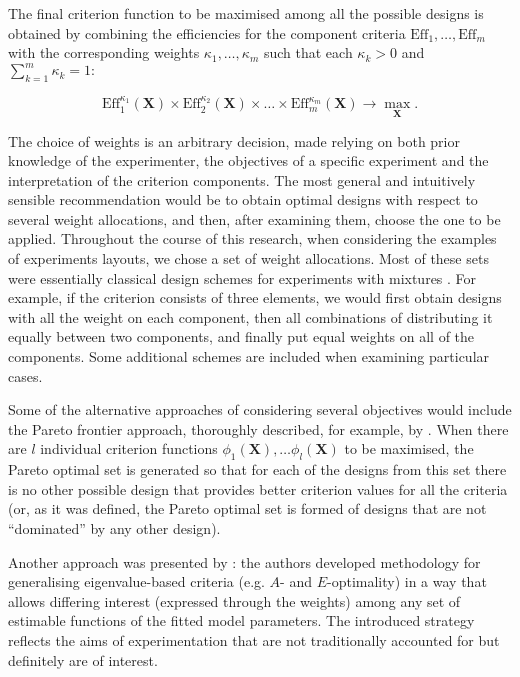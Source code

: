 \documentclass[11pt]{article}
\begin{document}
The final criterion function to be maximised among all the possible designs is obtained by combining the efficiencies for the component criteria $\mbox{Eff}_{1},\ldots, \mbox{Eff}_{m}$ with the corresponding weights $\kappa_{1},\ldots ,\kappa_{m}$ such that each $\kappa_{k}>0$ and $\sum_{k=1}^{m}\kappa_{k}=1:$

\begin{equation}
\label{eq::compound}
\mbox{Eff}^{\kappa_{1}}_{1}(\bm{X})\times\mbox{Eff}^{\kappa_{2}}_{2}(\bm{X})\times\ldots\times\mbox{Eff}^{\kappa_{m}}_{m}(\bm{X})\rightarrow \underset{\bm{X}}\max.
\end{equation}

The choice of weights is an arbitrary decision, made relying on both prior knowledge of the experimenter, the objectives of a specific experiment and the interpretation of the criterion components. The most general and intuitively sensible recommendation would be to obtain optimal designs with respect to several weight allocations, and then, after examining them, choose the one to be applied. Throughout the course of this research, when considering the examples of experiments layouts, we chose a set of weight allocations. Most of these sets were essentially classical design schemes for experiments with mixtures \citep{Cornell2011Mixtures}. For example, if the criterion consists of three elements, we would first obtain designs with all the weight on each component, then all combinations of distributing it equally between two components, and finally put equal weights on all of the components. Some additional schemes are included when examining particular cases.  

Some of the alternative approaches of considering several objectives would include the Pareto frontier approach, thoroughly described, for example, by \cite{Lu2011optimization}. When there are $l$ individual criterion functions $\phi_1(\bm{X}),\ldots\phi_{l}(\bm{X})$ to be maximised, the Pareto optimal set is generated so that for each of the designs from this set there is no other possible design that provides better criterion values for all the criteria (or, as it was defined, the Pareto optimal set is formed of designs that are not ``dominated'' by any other design).

Another approach was presented by \cite{Stallings2015general}: the authors developed methodology for generalising eigenvalue-based criteria (e.g. $A$- and $E$-optimality) in a way that allows differing interest (expressed through the weights) among any set of estimable functions of the fitted model parameters. The introduced strategy reflects the aims of experimentation that are not traditionally accounted for but definitely are of interest.
\end{document}
